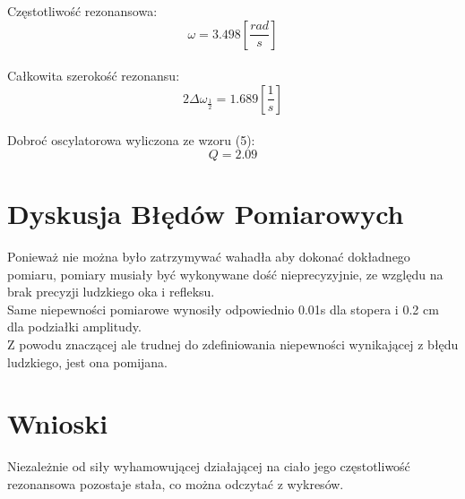\documentclass[]{article}
\begin{document}
	Częstotliwość rezonansowa:
	$$\omega = 3.498 \left[ \frac{rad}{s}\right]$$\\
	Całkowita szerokość rezonansu:
	$$2\Delta\omega_{\frac{1}{2}} = 1.689 \left[ \frac{1}{s}\right] $$\\	
	Dobroć oscylatorowa wyliczona ze wzoru (5):
	$$Q = 2.09$$
	
	\section{Dyskusja Błędów Pomiarowych}
	Ponieważ nie można było zatrzymywać wahadła aby dokonać dokładnego pomiaru, pomiary musiały być wykonywane dość nieprecyzyjnie, ze względu na brak precyzji ludzkiego oka i refleksu.\\
	Same niepewności pomiarowe wynosiły odpowiednio 0.01s dla stopera i 0.2 cm dla podziałki amplitudy.\\
	Z powodu znaczącej ale trudnej do zdefiniowania niepewności wynikającej z błędu ludzkiego, jest ona pomijana.
	\section{Wnioski}
	Niezależnie od siły wyhamowującej działającej na ciało jego częstotliwość rezonansowa pozostaje stała, co można odczytać z wykresów.
\end{document}
